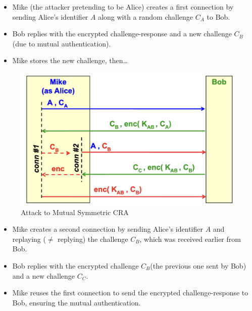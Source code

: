 \begin{multicols}{2}

    \begin{itemize}
        \item Mike (the attacker pretending to be Alice) creates a first connection by sending Alice's identifier $A$ along with a random challenge $C_A$ to Bob.
        \item Bob replies with the encrypted challenge-response and a new challenge $C_B$ (due to mutual authentication).
        \item Mike stores the new challenge, then\dots
    \end{itemize}
    \columnbreak

    \begin{figure}[H]
        \centering
        \includegraphics[width=\linewidth]{Images/Authentication/msCRAatt.png}
        \caption{Attack to Mutual Symmetric CRA}
    \end{figure}
\end{multicols}
\begin{itemize}
    \item Mike creates a second connection by sending Alice's identifier $A$ and replaying ($\ne$ replying) the challenge $C_B$, which was received earlier from Bob.
    \item Bob replies with the encrypted challenge $C_B$(the previous one sent by Bob) and a new challenge $C_C$.
    \item Mike reuses the first connection to send the encrypted challenge-response to Bob, ensuring the mutual authentication.
\end{itemize}

